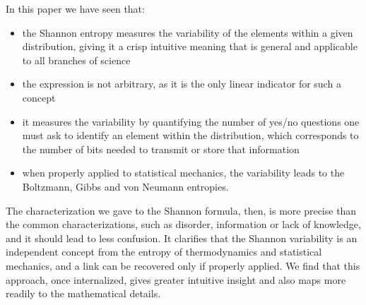 \documentclass[iopart]{revtex4-1}
\begin{document}
In this paper we have seen that:
\begin{itemize}
	\item the Shannon entropy measures the variability of the elements within a given distribution, giving it a crisp intuitive meaning that is general and applicable to all branches of science
	\item the expression is not arbitrary, as it is the only linear indicator for such a concept
	\item it measures the variability by quantifying the number of yes/no questions one must ask to identify an element within the distribution, which corresponds to the number of bits needed to transmit or store that information
	\item when properly applied to statistical mechanics, the variability leads to the Boltzmann, Gibbs and von Neumann entropies.
\end{itemize}
The characterization we gave to the Shannon formula, then, is more precise than the common characterizations, such as disorder, information or lack of knowledge, and it should lead to less confusion. It clarifies that the Shannon variability is an independent concept from the entropy of thermodynamics and statistical mechanics, and a link can be recovered only if properly applied. We find that this approach, once internalized, gives greater intuitive insight and also maps more readily to the mathematical details.

  

\end{document}
